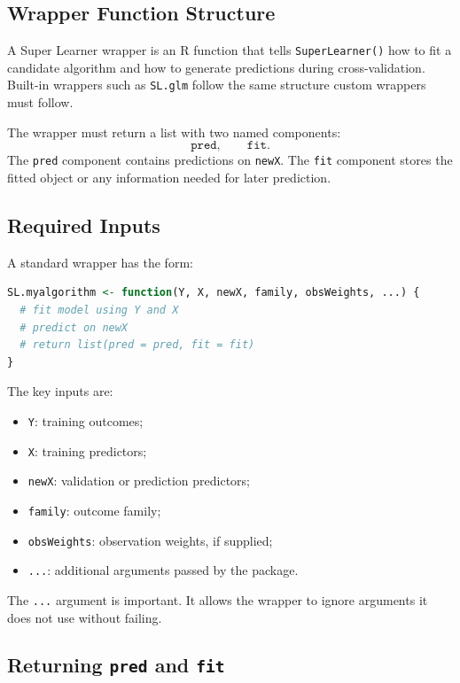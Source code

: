 \label{lec:6-5}

\subsection{Wrapper Function Structure}

A Super Learner wrapper is an R function that tells \texttt{SuperLearner()} how to fit
a candidate algorithm and how to generate predictions during cross-validation. Built-in
wrappers such as \texttt{SL.glm} follow the same structure custom wrappers must
follow.

The wrapper must return a list with two named components:
\[
\texttt{pred},\qquad \texttt{fit}.
\]
The \texttt{pred} component contains predictions on \texttt{newX}. The \texttt{fit}
component stores the fitted object or any information needed for later prediction.

\subsection{Required Inputs}

A standard wrapper has the form:

\begin{implementationbox}
\begin{lstlisting}[language=R]
SL.myalgorithm <- function(Y, X, newX, family, obsWeights, ...) {
  # fit model using Y and X
  # predict on newX
  # return list(pred = pred, fit = fit)
}
\end{lstlisting}
\end{implementationbox}

The key inputs are:
\begin{itemize}
\item \texttt{Y}: training outcomes;
\item \texttt{X}: training predictors;
\item \texttt{newX}: validation or prediction predictors;
\item \texttt{family}: outcome family;
\item \texttt{obsWeights}: observation weights, if supplied;
\item \texttt{...}: additional arguments passed by the package.
\end{itemize}

The \texttt{...} argument is important. It allows the wrapper to ignore arguments it
does not use without failing.

\subsection{Returning \texttt{pred} and \texttt{fit}}


